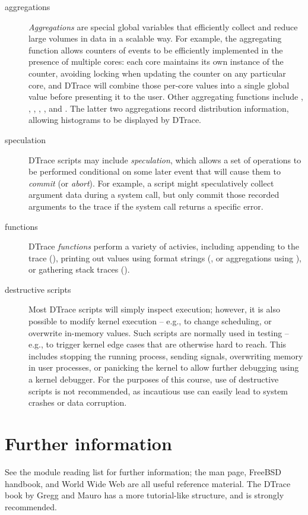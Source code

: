 \documentclass[a4paper,10pt]{article}
\begin{document}
\begin{description}
\item[aggregations] \textit{Aggregations} are special global variables that
  efficiently collect and reduce large volumes in data in a scalable way.
  For example, the  aggregating function allows counters of
  events to be efficiently implemented in the presence of multiple cores: each
  core maintains its own instance of the counter, avoiding locking when
  updating the counter on any particular core, and DTrace will combine those
  per-core values into a single global value before presenting it to the user.
  Other aggregating functions include , ,
  , , , and .
  The latter two aggregations record distribution information, allowing
  histograms to be displayed by DTrace.

\item[speculation] DTrace scripts may include \textit{speculation}, which
  allows a set of operations to be performed conditional on some later event
  that will cause them to \textit{commit} (or \textit{abort}).
  For example, a script might speculatively collect argument data during a
  system call, but only commit those recorded arguments to the trace if the
  system call returns a specific error.

\item[functions] DTrace \textit{functions} perform a variety of activies,
  including appending to the trace (), printing out values using
  format strings (, or aggregations using ), or
  gathering stack traces ().

\item[destructive scripts] Most DTrace scripts will simply inspect execution;
  however, it is also possible to modify kernel execution -- e.g., to change
  scheduling, or overwrite in-memory values.
  Such scripts are normally used in testing -- e.g., to trigger kernel edge
  cases that are otherwise hard to reach.
  This includes stopping the running process, sending signals, overwriting
  memory in user processes, or panicking the kernel to allow further debugging
  using a kernel debugger.
  For the purposes of this course, use of destructive scripts is not
  recommended, as incautious use can easily lead to system crashes or data
  corruption.
\end{description}

\section*{Further information}

See the module reading list for further information; the  man
page, FreeBSD handbook, and World Wide Web are all useful reference material.
The DTrace book by Gregg and Mauro has a more tutorial-like structure, and is
strongly recommended.
\end{document}
